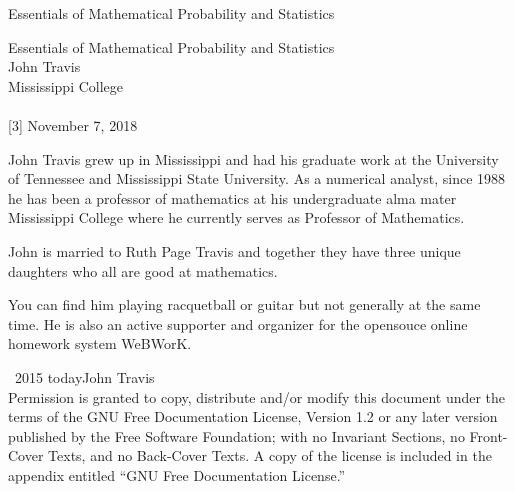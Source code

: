 \documentclass[10pt,]{book}
\numberwithin{equation}{section}
\begin{document}
\frontmatter
\thispagestyle{empty}
{\centering
\vspace*{0.28\textheight}
{\Huge Essentials of Mathematical Probability and Statistics}\\}
\clearpage
\thispagestyle{empty}
\null%
\clearpage
\thispagestyle{empty}
{\centering
\vspace*{0.14\textheight}
{\Huge Essentials of Mathematical Probability and Statistics}\\[3\baselineskip]
{\Large John Travis}\\[0.5\baselineskip]
{\Large Mississippi College}\\[3\baselineskip]
{\Large }\\[0.5\baselineskip]
[3\baselineskip]
{\Large November 7, 2018}\\}
\clearpage
\thispagestyle{empty}
\hypertarget{colophon-1}{}\noindent
\hypertarget{p-1}{}%
John Travis grew up in Mississippi and had his graduate work at the University of Tennessee and Mississippi State University. As a numerical analyst, since 1988 he has been a professor of mathematics at his undergraduate alma mater Mississippi College where he currently serves as Professor of Mathematics.%
\par
\hypertarget{p-2}{}%
John is married to Ruth Page Travis and together they have three unique daughters who all are good at mathematics.%
\par
\hypertarget{p-3}{}%
You can find him playing racquetball or guitar but not generally at the same time. He is also an active supporter and organizer for the opensouce online homework system WeBWorK.%
\par
{}
\noindent\textcopyright\ 2015 \textendash{}today\quad{}John Travis\\[0.5\baselineskip]
Permission is granted to copy, distribute and/or modify this document under the terms of the GNU Free Documentation License, Version 1.2 or any later version published by the Free Software Foundation; with no Invariant Sections, no Front-Cover Texts, and no Back-Cover Texts.  A copy of the license is included in the appendix entitled ``GNU Free Documentation License.''\par\medskip
{}
\null\clearpage
\end{document}
